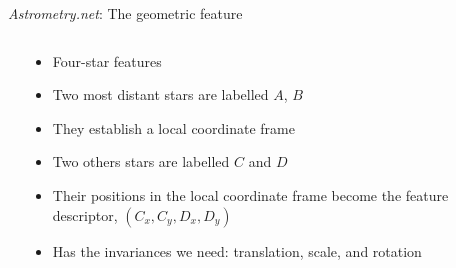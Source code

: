 \documentclass[compress]{beamer}
\newcommand{\an}{\emph{Astrometry.net}\xspace}
\begin{document}
\begin{frame}{\an: The geometric feature}
  \begin{columns}
	\begin{column}{0.5\textwidth}
	  \begin{center}
	  \end{center}
	\end{column}
	\begin{column}{0.5\textwidth}
	  \begin{itemize}
      \item Four-star features
	  \item Two \alert{most distant} stars are labelled $A$, $B$
	  \item They establish a \alert{local coordinate frame}
	  \item Two others stars are labelled $C$ and $D$
	  \item Their positions in the local coordinate frame become the
		\alert{feature descriptor}, $(C_x, C_y, D_x, D_y)$
      \item Has the \alert{invariances} we need: translation, scale, and rotation
	  \end{itemize}
	\end{column}
  \end{columns}
\end{frame}
\end{document}
